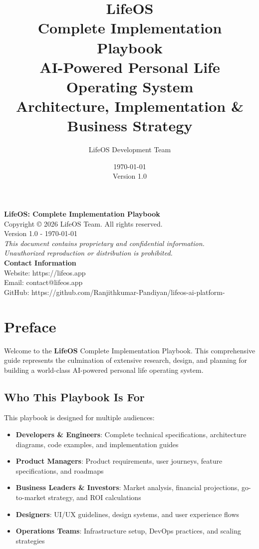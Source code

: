 \documentclass[12pt,a4paper,twoside,openright]{book}
\title{
    \Huge\textbf{LifeOS}\\
    \vspace{0.5cm}
    \Large Complete Implementation Playbook\\
    \vspace{0.3cm}
    \large AI-Powered Personal Life Operating System\\
    \vspace{0.5cm}
    \normalsize Architecture, Implementation \& Business Strategy
}
\author{LifeOS Development Team}
\date{\today\\Version 1.0}
\newcommand{\lifeos}{\textbf{LifeOS}}
\begin{document}
\frontmatter
\maketitle

\newpage
\thispagestyle{empty}
\vspace*{\fill}
\begin{center}
\textbf{LifeOS: Complete Implementation Playbook}\\
\vspace{0.5cm}
Copyright © 2026 LifeOS Team. All rights reserved.\\
\vspace{0.5cm}
Version 1.0 - \today\\
\vspace{1cm}
\textit{This document contains proprietary and confidential information.}\\
\textit{Unauthorized reproduction or distribution is prohibited.}\\
\vspace{1cm}
\textbf{Contact Information}\\
Website: https://lifeos.app\\
Email: contact@lifeos.app\\
GitHub: https://github.com/Ranjithkumar-Pandiyan/lifeos-ai-platform-
\end{center}
\vspace*{\fill}

\chapter*{Preface}

Welcome to the \lifeos{} Complete Implementation Playbook. This comprehensive guide represents the culmination of extensive research, design, and planning for building a world-class AI-powered personal life operating system.

\section*{Who This Playbook Is For}

This playbook is designed for multiple audiences:

\begin{itemize}
    \item \textbf{Developers \& Engineers}: Complete technical specifications, architecture diagrams, code examples, and implementation guides
    \item \textbf{Product Managers}: Product requirements, user journeys, feature specifications, and roadmaps
    \item \textbf{Business Leaders \& Investors}: Market analysis, financial projections, go-to-market strategy, and ROI calculations
    \item \textbf{Designers}: UI/UX guidelines, design systems, and user experience flows
    \item \textbf{Operations Teams}: Infrastructure setup, DevOps practices, and scaling strategies
\end{itemize}
\end{document}
